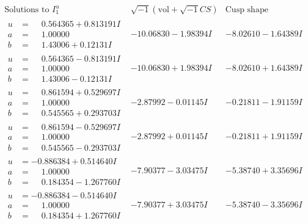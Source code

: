 \documentclass[1p]{elsarticle_modified}
\theoremstyle{definition}
\newcommand{\I}{\sqrt{-1}}
\begin{document}
$$\begin{array}{c|c|c}  
\text{Solutions to }I^u_{1}& \I (\text{vol} + \sqrt{-1}CS) & \text{Cusp shape}\\
 \hline 
\begin{aligned}
u &= \phantom{-}0.564365 + 0.813191 I \\
a &= \phantom{-}1.00000\phantom{ +0.000000I} \\
b &= \phantom{-}1.43006 + 0.12131 I\end{aligned}
 & -10.06830 - 1.98394 I & -8.02610 - 1.64389 I \\ \hline\begin{aligned}
u &= \phantom{-}0.564365 - 0.813191 I \\
a &= \phantom{-}1.00000\phantom{ +0.000000I} \\
b &= \phantom{-}1.43006 - 0.12131 I\end{aligned}
 & -10.06830 + 1.98394 I & -8.02610 + 1.64389 I \\ \hline\begin{aligned}
u &= \phantom{-}0.861594 + 0.529697 I \\
a &= \phantom{-}1.00000\phantom{ +0.000000I} \\
b &= \phantom{-}0.545565 + 0.293703 I\end{aligned}
 & -2.87992 - 0.01145 I & -0.21811 - 1.91159 I \\ \hline\begin{aligned}
u &= \phantom{-}0.861594 - 0.529697 I \\
a &= \phantom{-}1.00000\phantom{ +0.000000I} \\
b &= \phantom{-}0.545565 - 0.293703 I\end{aligned}
 & -2.87992 + 0.01145 I & -0.21811 + 1.91159 I \\ \hline\begin{aligned}
u &= -0.886384 + 0.514640 I \\
a &= \phantom{-}1.00000\phantom{ +0.000000I} \\
b &= \phantom{-}0.184354 - 1.267760 I\end{aligned}
 & -7.90377 - 3.03475 I & -5.38740 + 3.35696 I \\ \hline\begin{aligned}
u &= -0.886384 - 0.514640 I \\
a &= \phantom{-}1.00000\phantom{ +0.000000I} \\
b &= \phantom{-}0.184354 + 1.267760 I\end{aligned}
 & -7.90377 + 3.03475 I & -5.38740 - 3.35696 I \\ \hline\begin{aligned}

\end{aligned}
\end{array}$$
\end{document}
